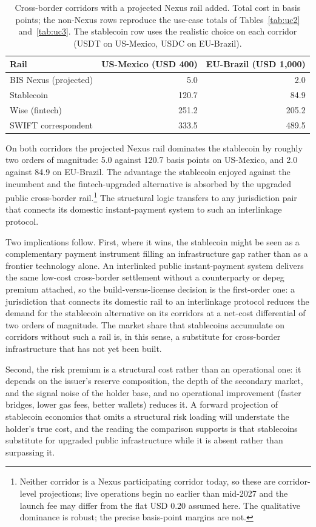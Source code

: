 \begin{table}[H]
\centering
\caption{Cross-border corridors with a projected Nexus rail added. Total cost in basis points; the non-Nexus rows reproduce the use-case totals of Tables~\ref{tab:uc2} and~\ref{tab:uc3}. The stablecoin row uses the realistic choice on each corridor (USDT on US-Mexico, USDC on EU-Brazil).}\label{tab:nexus_cross_border}
\begin{tabular}{lrr}
\toprule
Rail & US-Mexico (USD 400) & EU-Brazil (USD 1{,}000) \\
\midrule
BIS Nexus (projected) & 5.0   & 2.0   \\
Stablecoin            & 120.7 & 84.9  \\
Wise (fintech)        & 251.2 & 205.2 \\
SWIFT correspondent   & 333.5 & 489.5 \\
\bottomrule
\end{tabular}
\end{table}

On both corridors the projected Nexus rail dominates the stablecoin by roughly two orders of magnitude: 5.0 against 120.7 basis points on US-Mexico, and 2.0 against 84.9 on EU-Brazil. The advantage the stablecoin enjoyed against the incumbent and the fintech-upgraded alternative is absorbed by the upgraded public cross-border rail.\footnote{Neither corridor is a Nexus participating corridor today, so these are corridor-level projections; live operations begin no earlier than mid-2027 and the launch fee may differ from the flat USD 0.20 assumed here. The qualitative dominance is robust; the precise basis-point margins are not.} The structural logic transfers to any jurisdiction pair that connects its domestic instant-payment system to such an interlinkage protocol.

Two implications follow. First, where it wins, the stablecoin might be seen as a complementary payment instrument filling an infrastructure gap rather than as a frontier technology alone. An interlinked public instant-payment system delivers the same low-cost cross-border settlement without a counterparty or depeg premium attached, so the build-versus-license decision is the first-order one: a jurisdiction that connects its domestic rail to an interlinkage protocol reduces the demand for the stablecoin alternative on its corridors at a net-cost differential of two orders of magnitude. The market share that stablecoins accumulate on corridors without such a rail is, in this sense, a substitute for cross-border infrastructure that has not yet been built.

Second, the risk premium is a structural cost rather than an operational one: it depends on the issuer's reserve composition, the depth of the secondary market, and the signal noise of the holder base, and no operational improvement (faster bridges, lower gas fees, better wallets) reduces it. A forward projection of stablecoin economics that omits a structural risk loading will understate the holder's true cost, and the reading the comparison supports is that stablecoins substitute for upgraded public infrastructure while it is absent rather than surpassing it.
